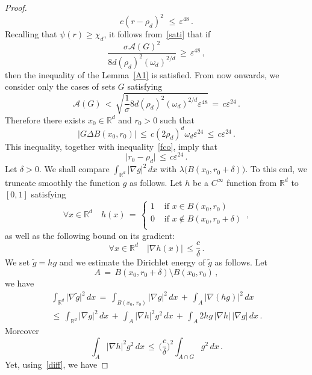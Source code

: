 \documentclass[AHL, Unicode, longabstracts, published]{cedram}
\newcommand*\Rd {{\mathbb R^d}}
\newcommand*\R{\mathbb{R}}
\newcommand*\gt{\widetilde g}
\newcommand{\cA}{\mathcal{A}}
\let\oldforall\forall
\renewcommand*{\forall}{\mathrel{\oldforall}}
\begin{document}
\begin{proof}
\begin{equation}\label{fco}
c(r-\rho_d)^2\,\,\leq\,\varepsilon^{48}\,.
\end{equation}
Recalling that $\psi(r)\geq\chi_d$, it follows from~\eqref{sati} that if
\[
\frac{\sigma\cA(G)^2}{8d(\rho_d)^{2}(\omega_d)^{2/d}}
\,\geq\,\varepsilon^{48}\,,
\]
then the inequality of the Lemma~\ref{A1} is satisfied. From now onwards, we consider only the cases of sets $G$ satisfying
\begin{equation}\label{sata}
{\cA(G)}
\,<\,
\sqrt{\frac{1}{\sigma}{8d(\rho_d)^{2}(\omega_d)^{2/d}}\varepsilon^{48}}\,=\, c\varepsilon^{24}\,.
\end{equation}
Therefore there exists $x_0\in\Rd$ and $r_0>0$ such that
\begin{equation}\label{diff}
\big|G\Delta B(x_0,r_0)\big|\,\leq\, c (2\rho_d)^d\omega_d
\varepsilon^{24}
\,\leq\, c\varepsilon^{24}
\,.
\end{equation}
This inequality, together with inequality~\eqref{fco}, imply that
\begin{equation}\label{adiff}
\big|r_0-\rho_d\big|\,\leq\, c\varepsilon^{24}
\,.
\end{equation}
Let $\delta>0$. We shall compare $\int_{\Rd}\big|\nabla g\big|^2\,dx$ with $\lambda\big({B(x_0,r_0+\delta)}\big)$. To this end, we truncate smoothly the function $g$ as follows. Let $h$ be a $C^\infty$ function from $\R^d$ to $[0,1]$ satisfying
\[
\forall x\in\Rd\quad
h(x)\,=\,
\begin{cases}
1 & \text{ if }x\in B(x_0,r_0)\\ 0 & \text{ if }x\not\in B(x_0,r_0+\delta)\\
\end{cases}\,,
\]
as well as the following bound on its gradient:
\[
\forall x\in\Rd\quad
\big|\nabla h(x)\big|\,\leq\frac{c}{\delta}\,.
\]
We set $\gt=hg$ and we estimate the Dirichlet energy of $\gt$ as follows. Let
\[
A\,=\,B(x_0,r_0+\delta)\setminus B(x_0,r_0)\,,
\]
we have
\begin{multline}\label{kold}
\int_{\Rd}\big|\nabla \gt\big|^2\,dx\,=\,
\int_{B(x_0,\,r_0)}\big|\nabla g\big|^2\,dx\,+\,
\int_{A}\big|\nabla (hg)\big|^2\,dx\,\\
\leq\,
\int_{\Rd}\big|\nabla g\big|^2\,dx\,+\,
\int_{A}\big|\nabla h\big|^2g^2\,dx\,+\,
\int_{A}2hg \,
\big|\nabla h\big|\,
\big|\nabla g\big|\,dx\,.
\end{multline}
Moreover
\[
\int_{A}\big|\nabla h\big|^2g^2\,dx
\,\leq\,
\Big(\frac{c}{\delta}\Big)^2
\int_{A\cap G}g^2\,dx\,.
\]
Yet, using~\eqref{diff}, we have

\end{proof}
\end{document}
